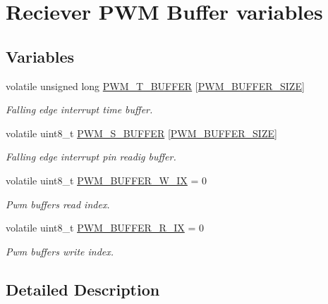 \hypertarget{group__PwmBuffers}{}\section{Reciever P\+WM Buffer variables}
\label{group__PwmBuffers}
\subsection*{Variables}
\begin{DoxyCompactItemize}
\item 
volatile unsigned long \hyperlink{group__PwmBuffers_ga1980b7b5ba1ceabb0b5c60c9da70164e}{P\+W\+M\+\_\+\+T\+\_\+\+B\+U\+F\+F\+ER} \mbox{[}\hyperlink{group__PwmInputConstants_gae2449e7e1058591bfbfdc0901c185602}{P\+W\+M\+\_\+\+B\+U\+F\+F\+E\+R\+\_\+\+S\+I\+ZE}\mbox{]}\hypertarget{group__PwmBuffers_ga1980b7b5ba1ceabb0b5c60c9da70164e}{}\label{group__PwmBuffers_ga1980b7b5ba1ceabb0b5c60c9da70164e}

\begin{DoxyCompactList}\small\item\em Falling edge interrupt time buffer. \end{DoxyCompactList}\item 
volatile uint8\+\_\+t \hyperlink{group__PwmBuffers_gaed4f8ecf3e1ca2d8bfa8904a43729f57}{P\+W\+M\+\_\+\+S\+\_\+\+B\+U\+F\+F\+ER} \mbox{[}\hyperlink{group__PwmInputConstants_gae2449e7e1058591bfbfdc0901c185602}{P\+W\+M\+\_\+\+B\+U\+F\+F\+E\+R\+\_\+\+S\+I\+ZE}\mbox{]}\hypertarget{group__PwmBuffers_gaed4f8ecf3e1ca2d8bfa8904a43729f57}{}\label{group__PwmBuffers_gaed4f8ecf3e1ca2d8bfa8904a43729f57}

\begin{DoxyCompactList}\small\item\em Falling edge interrupt pin readig buffer. \end{DoxyCompactList}\item 
volatile uint8\+\_\+t \hyperlink{group__PwmBuffers_ga240562bcf38322f5e5fe4498c0884a79}{P\+W\+M\+\_\+\+B\+U\+F\+F\+E\+R\+\_\+\+W\+\_\+\+IX} = 0\hypertarget{group__PwmBuffers_ga240562bcf38322f5e5fe4498c0884a79}{}\label{group__PwmBuffers_ga240562bcf38322f5e5fe4498c0884a79}

\begin{DoxyCompactList}\small\item\em Pwm buffers read index. \end{DoxyCompactList}\item 
volatile uint8\+\_\+t \hyperlink{group__PwmBuffers_gac0879dcb58dda890aceef95b7f4bc793}{P\+W\+M\+\_\+\+B\+U\+F\+F\+E\+R\+\_\+\+R\+\_\+\+IX} = 0\hypertarget{group__PwmBuffers_gac0879dcb58dda890aceef95b7f4bc793}{}\label{group__PwmBuffers_gac0879dcb58dda890aceef95b7f4bc793}

\begin{DoxyCompactList}\small\item\em Pwm buffers write index. \end{DoxyCompactList}\end{DoxyCompactItemize}


\subsection{Detailed Description}
